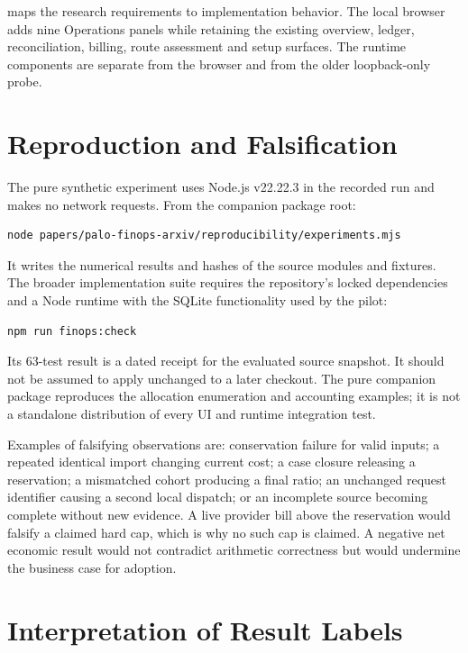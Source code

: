 \documentclass[10pt,twocolumn]{article}
\begin{document}
 maps the research requirements to implementation behavior. The local browser adds nine Operations panels while retaining the existing overview, ledger, reconciliation, billing, route assessment and setup surfaces. The runtime components are separate from the browser and from the older loopback-only probe.

\section{Reproduction and Falsification}
\label{sec:repro}

The pure synthetic experiment uses Node.js v22.22.3 in the recorded run and makes no network requests. From the companion package root:
\begin{lstlisting}[style=palo]
node papers/palo-finops-arxiv/reproducibility/experiments.mjs
\end{lstlisting}
It writes the numerical results and hashes of the source modules and fixtures. The broader implementation suite requires the repository's locked dependencies and a Node runtime with the SQLite functionality used by the pilot:
\begin{lstlisting}[style=palo]
npm run finops:check
\end{lstlisting}
Its 63-test result is a dated receipt for the evaluated source snapshot. It should not be assumed to apply unchanged to a later checkout. The pure companion package reproduces the allocation enumeration and accounting examples; it is not a standalone distribution of every UI and runtime integration test.

Examples of falsifying observations are: conservation failure for valid inputs; a repeated identical import changing current cost; a case closure releasing a reservation; a mismatched cohort producing a final ratio; an unchanged request identifier causing a second local dispatch; or an incomplete source becoming complete without new evidence. A live provider bill above the reservation would falsify a claimed hard cap, which is why no such cap is claimed. A negative net economic result would not contradict arithmetic correctness but would undermine the business case for adoption.

\section{Interpretation of Result Labels}
\end{document}
